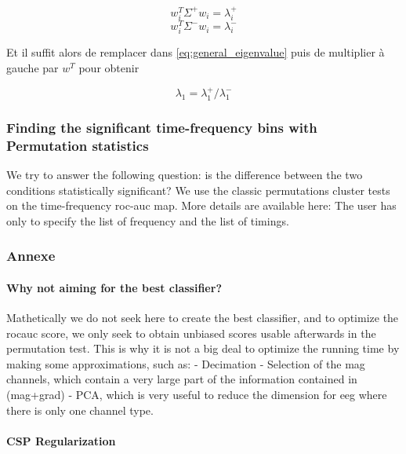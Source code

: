 \begin{equation}
    w^{T}_{i} \Sigma^{+} w_{i} = \lambda^{+}_{i}
    \label{eq:lambda_plus_first_component}
\end{equation}
\begin{equation}
    w^{T}_{i} \Sigma^{-} w_{i} = \lambda^{-}_{i}
   \label{eq:lambda_minus_first_component}
\end{equation}

Et il suffit alors de remplacer dans \ref{eq:general_eigenvalue} puis de multiplier à gauche par $w^{T}$ pour obtenir

\begin{equation}
    \lambda_1 = \lambda^{+}_1 / \lambda^{-}_1
\end{equation}

\subsubsection{Finding the significant time-frequency bins with Permutation statistics}

We try to answer the following question: is the difference between
the two conditions statistically significant? We use the classic permutations
cluster tests on the time-frequency roc-auc map.
More details are available here:
The user has only to specify the list of frequency and the list of timings.


\subsubsection{Annexe}

\paragraph{Why not aiming for the best classifier?}
Mathetically we do not seek here to create the best classifier,
and to optimize the rocauc score, we only seek
to obtain unbiased scores usable afterwards in the permutation test.
This is why it is not a big deal to optimize the running time
by making some approximations, such as:
- Decimation
- Selection of the mag channels, which contain a very large part of
    the information contained in (mag+grad)
- PCA, which is very useful to reduce the dimension for eeg
    where there is only one channel type.

\paragraph{CSP Regularization}

